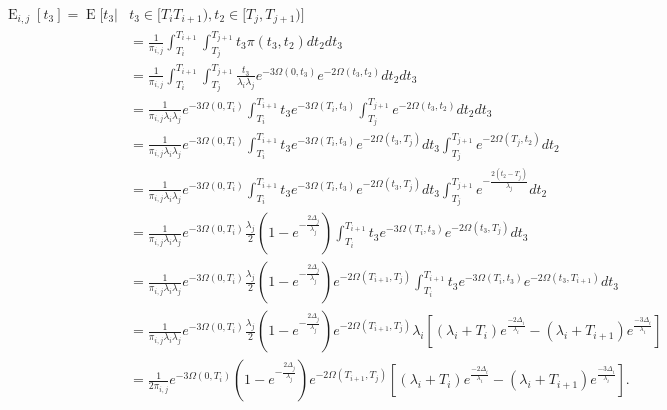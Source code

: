 \documentclass{article}
\DeclareMathOperator{\E}{E}
\begin{document}
\begin{align}
    \begin{split}
        \E_{i,j}[t_3] = \E\big[t_3|&t_3 \in [T_i T_{i+1}),t_2 \in [T_j,T_{j+1}) \big]\\
        &= \frac{1}{\pi_{i,j}}\int_{T_i}^{T_{i+1}}\int_{T_j}^{T_{j+1}}t_3\pi(t_3,t_2)dt_2dt_3\\
        &= \frac{1}{\pi_{i,j}}\int_{T_i}^{T_{i+1}}\int_{T_j}^{T_{j+1}}
            \frac{t_3}{\lambda_i \lambda_j}e^{-3\Omega(0,t_3)}e^{-2\Omega(t_3,t_2)}dt_2dt_3\\
        &=\frac{1}{\pi_{i,j}\lambda_i\lambda_j}e^{-3\Omega(0,T_i)}
            \int_{T_i}^{T_{i+1}}t_3e^{-3\Omega(T_i,t_3)}\int_{T_j}^{T_{j+1}}e^{-2\Omega(t_3,t_2)}dt_2dt_3\\
        &=\frac{1}{\pi_{i,j}\lambda_i\lambda_j}e^{-3\Omega(0,T_i)}
            \int_{T_i}^{T_{i+1}}t_3e^{-3\Omega(T_i,t_3)}e^{-2\Omega(t_3,T_j)}dt_3\int_{T_j}^{T_{j+1}}e^{-2\Omega(T_j,t_2)}dt_2\\
        &=\frac{1}{\pi_{i,j}\lambda_i\lambda_j}e^{-3\Omega(0,T_i)}
            \int_{T_i}^{T_{i+1}}t_3e^{-3\Omega(T_i,t_3)}e^{-2\Omega(t_3,T_j)}dt_3\int_{T_j}^{T_{j+1}}e^{-\frac{2(t_2-T_j)}{\lambda_j}}dt_2\\
        &=\frac{1}{\pi_{i,j}\lambda_i\lambda_j}e^{-3\Omega(0,T_i)}\frac{\lambda_j}{2}\left(1-e^{-\frac{2\Delta_j}{\lambda_j}}\right)
            \int_{T_i}^{T_{i+1}}t_3e^{-3\Omega(T_i,t_3)}e^{-2\Omega(t_3,T_j)}dt_3\\
        &=\frac{1}{\pi_{i,j}\lambda_i\lambda_j}e^{-3\Omega(0,T_i)}
            \frac{\lambda_j}{2}\left(1-e^{-\frac{2\Delta_j}{\lambda_j}}\right)e^{-2\Omega(T_{i+1},T_j)}
            \int_{T_i}^{T_{i+1}}t_3e^{-3\Omega(T_i,t_3)}e^{-2\Omega(t_3,T_{i+1})}dt_3\\
        &=\frac{1}{\pi_{i,j}\lambda_i\lambda_j}e^{-3\Omega(0,T_i)}
            \frac{\lambda_j}{2}\left(1-e^{-\frac{2\Delta_j}{\lambda_j}}\right)e^{-2\Omega(T_{i+1},T_j)}
            \lambda_i\left[(\lambda_i+T_i)e^{\frac{-2\Delta_i}{\lambda_i}}-(\lambda_i+T_{i+1})e^{\frac{-3\Delta_i}{\lambda_i}}\right]\\
        &=\frac{1}{2\pi_{i,j}}e^{-3\Omega(0,T_i)}
            \left(1-e^{-\frac{2\Delta_j}{\lambda_j}}\right)e^{-2\Omega(T_{i+1},T_j)}
            \left[(\lambda_i+T_i)e^{\frac{-2\Delta_i}{\lambda_i}}-(\lambda_i+T_{i+1})e^{\frac{-3\Delta_i}{\lambda_i}}\right].\\
    \end{split}
    \label{eq:Et3}
\end{align}
\end{document}
